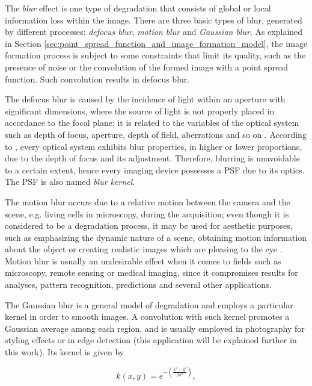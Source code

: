 The \emph{blur} effect is one type of degradation that consists of global or local information loss within the image. There are three basic types of blur, generated by different processes: \emph{defocus blur}, \emph{motion blur} and \emph{Gaussian blur}. As explained in Section \ref{sec:point_spread_function_and_image_formation_model}, the image formation process is subject to some constraints that limit its quality, such as the presence of noise or the convolution of the formed image with a point spread function. Such convolution results in defocus blur. 

The defocus blur is caused by the incidence of light within an aperture with significant dimensions, where the source of light is not properly placed in accordance to the focal plane; it is related to the variables of the optical system such as depth of focus, aperture, depth of field, aberrations and so on \cite{joshi2014defocus}. According to , every optical system exhibits blur properties, in higher or lower proportions, due to the depth of focus and its adjustment. Therefore, blurring is unavoidable to a certain extent, hence every imaging device possesses a PSF due to its optics. The PSF is also named \emph{blur kernel}.

The motion blur occurs due to a relative motion between the camera and the scene, e.g. living cells in microscopy, during the acquisition; even though it is considered to be a degradation process, it may be used for aesthetic purposes, such as emphasizing the dynamic nature of a scene, obtaining motion information about the object or creating realistic images which are pleasing to the eye \cite{nayar2004motion}. Motion blur is usually an undesirable effect when it comes to fields such as microscopy, remote sensing or medical imaging, since it compromises results for analyses, pattern recognition, predictions and several other applications.

The Gaussian blur is a general model of degradation and employs a particular kernel in order to smooth images. A convolution with such kernel promotes a Gaussian average among each region, and is usually employed in photography for styling effects or in edge detection (this application will be explained further in this work). Its kernel \cite{nixon2019feature} is given by

\begin{equation}
\label{eqn:gaussian_blur}
k(x,y) = e^{-
            \left( 
                \frac{x^{2} + y^{2}}{2 \sigma^{2}}
            \right)
            },
\end{equation}

